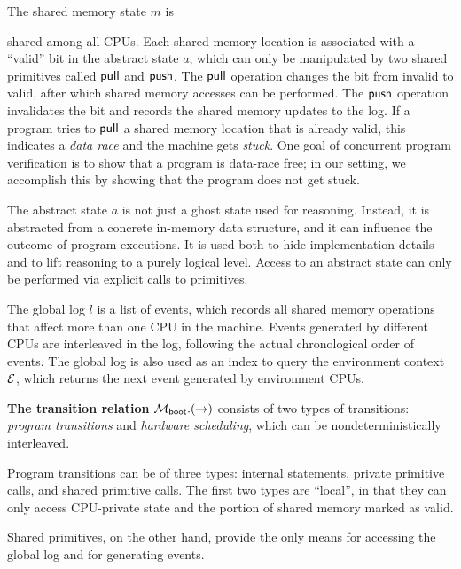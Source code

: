 The shared memory state  $m$ is shared among all CPUs.
Each shared memory location is associated
with a ``valid'' bit in the abstract state $a$, which can only be manipulated by 
two shared primitives called $\mathsf{pull}$ and $\mathsf{push}$. The $\mathsf{pull}$ operation
changes the bit from invalid to valid, after which shared memory accesses
can be performed. The $\mathsf{push}$ operation invalidates the bit
and records the shared memory updates to the log.
If a program tries to $\mathsf{pull}$ a shared memory location that is already valid,
this indicates a \emph{data race} and the machine gets \emph{stuck}.
One goal of concurrent program verification is to show
that a program is data-race free; in our setting, we accomplish 
this by showing that the program does not get stuck.

The abstract state $a$ is not just a ghost state used for reasoning.
Instead, it is abstracted from a concrete in-memory data structure,
and it can influence the outcome of program executions.
It is used both to hide implementation details and to lift reasoning
to a purely logical level. Access to an abstract state can only
be performed via explicit calls to primitives.


The global log $l$ 
is a list of events, which records all shared memory operations that affect more than
one CPU in the machine. Events generated by different CPUs are
interleaved in the log, following the actual chronological order of events.
The global log is also used as an index to query the environment context
$\mathcal{E}$, which returns the next event generated by environment CPUs.


\textbf{The transition relation} 
$\mathcal{M}_{\mathsf{boot}}.(\rightarrow)$ consists of two types of transitions: 
\emph{program transitions} and \emph{hardware scheduling}, which can 
be nondeterministically interleaved.

Program transitions can be of three types:
internal statements, private primitive calls, and shared primitive calls.
The first two types are ``local'', in that they can only access CPU-private 
state and the portion of shared memory marked as valid.
Shared primitives, on the other hand, provide the only means 
for accessing the global log and for generating events.

